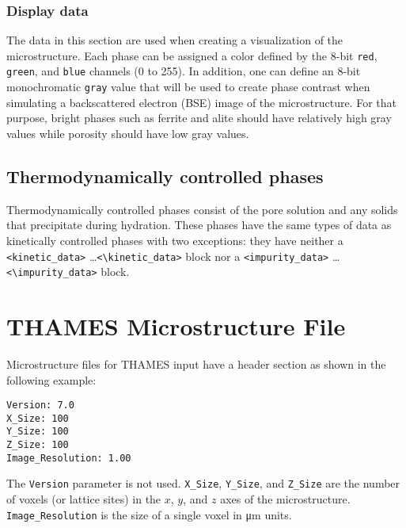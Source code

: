\documentclass{article}
\begin{document}
\subsubsection{Display data}
The data in this section are used when creating a visualization of the
microstructure.  Each phase can be assigned a color defined by the
8-bit \texttt{red}, \texttt{green}, and \texttt{blue} channels (\num{0}
to \num{255}).  In addition, one can define an 8-bit monochromatic \texttt{gray}
value that will be used to create phase contrast when simulating a
backscattered electron (BSE) image of the microstructure.  For that purpose,
bright phases such as ferrite and alite should have relatively high
gray values while porosity should have low gray values.

\subsection{Thermodynamically controlled phases}
Thermodynamically controlled phases consist of the pore solution and any solids
that precipitate during hydration.  These phases have the same types of data as kinetically
controlled phases with two exceptions: they have neither a
\verb!<kinetic_data>! \ldots \verb!<\kinetic_data>! block
nor a \verb!<impurity_data>! \ldots \verb!<\impurity_data>! block.

\section{\label{sec:microstructure} THAMES Microstructure File}
Microstructure files for THAMES input have a header section as shown
in the following example:

\begin{lstlisting}
Version: 7.0
X_Size: 100
Y_Size: 100
Z_Size: 100
Image_Resolution: 1.00
\end{lstlisting}
The \texttt{Version} parameter is not used.  \verb!X_Size!, \verb!Y_Size!, and
\verb!Z_Size! are the number of voxels (or lattice sites) in the $x$, $y$, and
$z$ axes of the microstructure.  \verb!Image_Resolution! is the size of a single
voxel in \si{\micro\meter} units.
\end{document}
